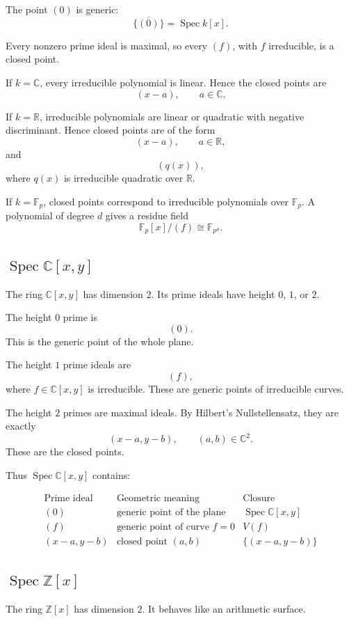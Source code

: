 \documentclass[12pt,a4paper]{article}
\newcommand{\Z}{\mathbb{Z}}
\newcommand{\R}{\mathbb{R}}
\newcommand{\C}{\mathbb{C}}
\newcommand{\Spec}{\operatorname{Spec}}
\newcommand{\Fp}{\mathbb F_p}
\begin{document}
The point \((0)\) is generic:
\[
\overline{\{(0)\}}=\Spec k[x].
\]

Every nonzero prime ideal is maximal, so every \((f)\), with \(f\) irreducible,
is a closed point.

If \(k=\C\), every irreducible polynomial is linear. Hence the closed points are
\[
(x-a),\qquad a\in\C.
\]

If \(k=\R\), irreducible polynomials are linear or quadratic with negative
discriminant. Hence closed points are of the form
\[
(x-a),\qquad a\in\R,
\]
and
\[
(q(x)),
\]
where \(q(x)\) is irreducible quadratic over \(\R\).

If \(k=\Fp\), closed points correspond to irreducible polynomials over \(\Fp\).
A polynomial of degree \(d\) gives a residue field
\[
\Fp[x]/(f)\cong \mathbb F_{p^d}.
\]

\subsection{\(\Spec \C[x,y]\)}

The ring \(\C[x,y]\) has dimension \(2\). Its prime ideals have height \(0\),
\(1\), or \(2\).

The height \(0\) prime is
\[
(0).
\]
This is the generic point of the whole plane.

The height \(1\) prime ideals are
\[
(f),
\]
where \(f\in\C[x,y]\) is irreducible. These are generic points of irreducible
curves.

The height \(2\) primes are maximal ideals. By Hilbert's Nullstellensatz, they
are exactly
\[
(x-a,y-b),
\qquad (a,b)\in\C^2.
\]
These are the closed points.

Thus \(\Spec\C[x,y]\) contains:

\[
\begin{array}{c|c|c}
	\text{Prime ideal} & \text{Geometric meaning} & \text{Closure}\\
	\hline
	(0) & \text{generic point of the plane} & \Spec\C[x,y]\\
	(f) & \text{generic point of curve }f=0 & V(f)\\
	(x-a,y-b) & \text{closed point }(a,b) & \{(x-a,y-b)\}
\end{array}
\]

\subsection{\(\Spec \Z[x]\)}

The ring \(\Z[x]\) has dimension \(2\). It behaves like an arithmetic surface.
\end{document}
